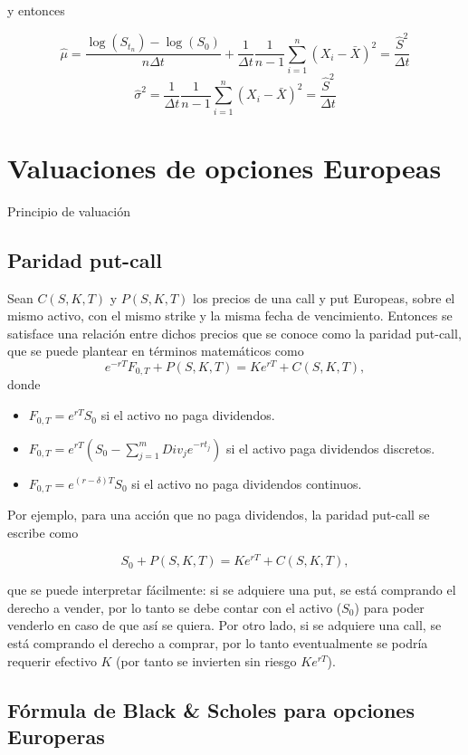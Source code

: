 \documentclass[12pt,reqno,letter]{article}
\providecommand{\tightlist}{%
	\setlength{\itemsep}{0pt}\setlength{\parskip}{0pt}}
\begin{document}
	y entonces
	
	$$\widehat{\mu} =\frac{\log(S_{t_n})-\log(S_0)}{n\Delta t}+ \frac{1}{\Delta t}\frac{1}{n-1}\sum_{i=1}^n(X_i-\bar{X})^2=\frac{\widehat{S}^2}{\Delta t}$$
	$$\widehat{\sigma}^2 = \frac{1}{\Delta t}\frac{1}{n-1}\sum_{i=1}^n(X_i-\bar{X})^2=\frac{\widehat{S}^2}{\Delta t}$$
	
	\section{Valuaciones de opciones
		Europeas}\label{valuaciones-de-opciones-europeas}
	
	Principio de valuación
	
	\subsection{Paridad put-call}\label{paridad-put-call}
	
	Sean \(C(S,K,T)\) y \(P(S,K,T)\) los precios de una call y put Europeas,
	sobre el mismo activo, con el mismo strike y la misma fecha de
	vencimiento. Entonces se satisface una relación entre dichos precios que
	se conoce como la paridad put-call, que se puede plantear en términos
	matemáticos como \[e^{-rT}F_{0,T} + P(S,K,T) = Ke^{rT} + C(S,K,T),\]
	donde
	
	\begin{itemize}
		\tightlist
		\item
		\(F_{0,T} = e^{rT}S_0\) si el activo no paga dividendos.
		\item
		\(F_{0,T} = e^{rT}\left(S_0 - \sum_{j=1}^m Div_j e^{-r t_j}\right)\)
		si el activo paga dividendos discretos.
		\item
		\(F_{0,T} = e^{(r-\delta)T}S_0\) si el activo no paga dividendos
		continuos.
	\end{itemize}
	
	Por ejemplo, para una acción que no paga dividendos, la paridad put-call
	se escribe como
	
	\[S_0 + P(S,K,T) = Ke^{rT} + C(S,K,T),\]
	
	que se puede interpretar fácilmente: si se adquiere una put, se está
	comprando el derecho a vender, por lo tanto se debe contar con el activo
	(\(S_0\)) para poder venderlo en caso de que así se quiera. Por otro
	lado, si se adquiere una call, se está comprando el derecho a comprar,
	por lo tanto eventualmente se podría requerir efectivo \(K\) (por tanto
	se invierten sin riesgo \(Ke^{rT}\)).
	
	\subsection{Fórmula de Black \& Scholes para opciones
		Europeras}\label{formula-de-black-scholes-para-opciones-europeras}
	
\end{document}
